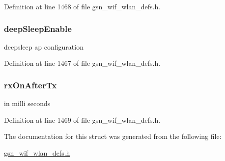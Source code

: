 Definition at line 1468 of file gsn\_\-wif\_\-wlan\_\-defs.h.

\hypertarget{a00368_a15a109bea71602dc845f3747d938b556}{
\subsubsection[{deepSleepEnable}]{ {\bf deepSleepEnable}}}
\label{a00368_a15a109bea71602dc845f3747d938b556}
deepsleep ap configuration 

Definition at line 1467 of file gsn\_\-wif\_\-wlan\_\-defs.h.

\hypertarget{a00368_a508b8ee456028ea3adfeb6b9fdda72e9}{
\subsubsection[{rxOnAfterTx}]{ {\bf rxOnAfterTx}}}
\label{a00368_a508b8ee456028ea3adfeb6b9fdda72e9}
in milli seconds 

Definition at line 1469 of file gsn\_\-wif\_\-wlan\_\-defs.h.



The documentation for this struct was generated from the following file:\begin{DoxyCompactItemize}
\item 
\hyperlink{a00613}{gsn\_\-wif\_\-wlan\_\-defs.h}\end{DoxyCompactItemize}
